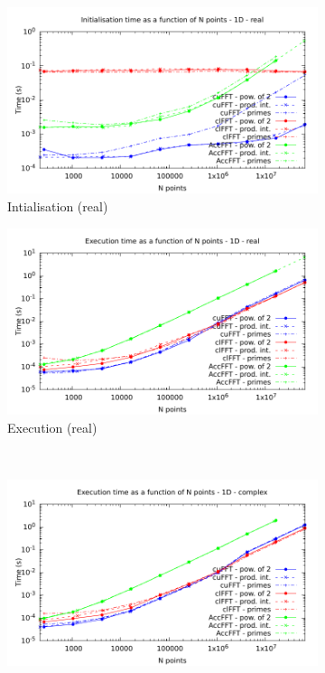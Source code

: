 \documentclass[12pt, a4paper]{article}
\begin{document}
\begin{figure}[H]
\captionsetup{width=0.8\linewidth}
\centering
\begin{subfigure}{.5\textwidth}
\centering
\includegraphics[width=.9\linewidth]{graphs/fft-1d-r-init.pdf}
\caption{Intialisation (real)}
\label{FFT1DRI}
\end{subfigure}%
\begin{subfigure}{.5\textwidth}
\centering
\includegraphics[width=.9\linewidth]{graphs/fft-1d-r-exec.pdf}
\caption{Execution (real)}
\label{FFT1DRE}
\end{subfigure}\\
\begin{subfigure}{.5\textwidth}
\centering
\includegraphics[width=.9\linewidth]{graphs/fft-1d-c-exec.pdf}

\end{subfigure}
\end{figure}
\end{document}
